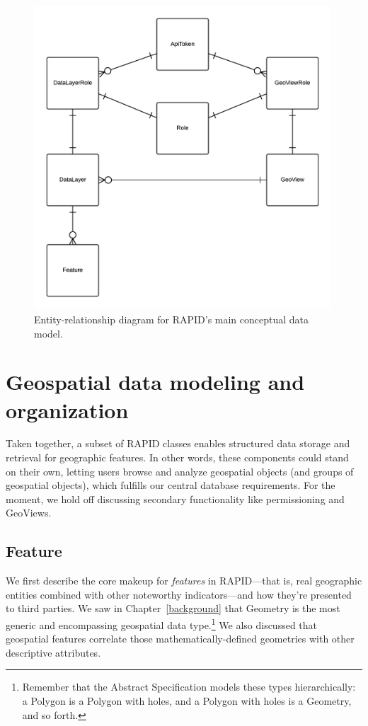 \begin{figure}
    \centering
    \includegraphics[width=0.99\textwidth]{figures/er.png}
    \caption{Entity-relationship diagram for RAPID's main conceptual data model.}
    \label{fig:permissions}
\end{figure}

\section{Geospatial data modeling and organization}
Taken together, a subset of RAPID classes enables structured data storage and retrieval for geographic features. In other words, these components could stand on their own, letting users browse and analyze geospatial objects (and groups of geospatial objects), which fulfills our central database requirements. For the moment, we hold off discussing secondary functionality like permissioning and GeoViews.

\subsection{Feature}
We first describe the core makeup for \textit{features} in RAPID---that is, real geographic entities combined with other noteworthy indicators---and how they're presented to third parties. We saw in Chapter~\ref{background} that Geometry is the most generic and encompassing geospatial data type.\footnote{Remember that the Abstract Specification models these types hierarchically: a Polygon is a Polygon with holes, and a Polygon with holes is a Geometry, and so forth.} We also discussed that geospatial features correlate those mathematically-defined geometries with other descriptive attributes.

